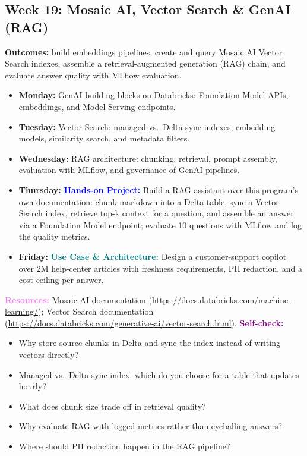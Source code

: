 \documentclass[11pt, a4paper]{article}
\newcommand{\project}[1]{\vspace{1mm}\noindent\textbf{\textcolor{blue}{Hands-on Project:}} #1}
\newcommand{\usecase}[1]{\vspace{1mm}\noindent\textbf{\textcolor{teal}{Use Case \& Architecture:}} #1}
\newcommand{\dayitem}[2]{\item \textbf{#1:} #2}
\newcommand{\resources}[1]{\vspace{1mm}\noindent\textbf{\textcolor{violet}{Resources:}} #1}
\newcommand{\selfcheck}[1]{\vspace{1mm}\noindent\textbf{\textcolor{purple}{Self-check:}} #1}
\begin{document}
\subsection*{Week 19: Mosaic AI, Vector Search \& GenAI (RAG)}
\par\noindent\textbf{Outcomes:} build embeddings pipelines, create and query Mosaic AI Vector Search indexes, assemble a retrieval-augmented generation (RAG) chain, and evaluate answer quality with MLflow evaluation.
\begin{itemize}[label=-]
    \dayitem{Monday}{GenAI building blocks on Databricks: Foundation Model APIs, embeddings, and Model Serving endpoints.}
    \dayitem{Tuesday}{Vector Search: managed vs.\ Delta-sync indexes, embedding models, similarity search, and metadata filters.}
    \dayitem{Wednesday}{RAG architecture: chunking, retrieval, prompt assembly, evaluation with MLflow, and governance of GenAI pipelines.}
    \dayitem{Thursday}{\project{Build a RAG assistant over this program's own documentation: chunk markdown into a Delta table, sync a Vector Search index, retrieve top-k context for a question, and assemble an answer via a Foundation Model endpoint; evaluate 10 questions with MLflow and log the quality metrics.}}
    \dayitem{Friday}{\usecase{Design a customer-support copilot over 2M help-center articles with freshness requirements, PII redaction, and a cost ceiling per answer.}}
\end{itemize}
\resources{Mosaic AI documentation (\url{https://docs.databricks.com/machine-learning/}); Vector Search documentation (\url{https://docs.databricks.com/generative-ai/vector-search.html}).}
\selfcheck{\begin{itemize}[label=-, leftmargin=1.5em, itemsep=0pt]
    \item Why store source chunks in Delta and sync the index instead of writing vectors directly?
    \item Managed vs.\ Delta-sync index: which do you choose for a table that updates hourly?
    \item What does chunk size trade off in retrieval quality?
    \item Why evaluate RAG with logged metrics rather than eyeballing answers?
    \item Where should PII redaction happen in the RAG pipeline?
\end{itemize}}
\end{document}
